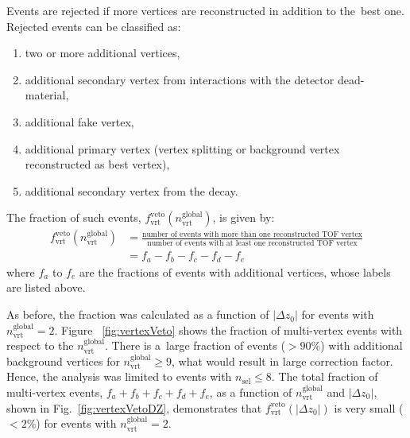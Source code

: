 Events are rejected if more vertices are reconstructed in addition to the~best one. Rejected events can be classified as:

\begin{enumerate}[label=\alph*)]
	\item two or more additional vertices,
	\item additional  secondary vertex from interactions with the detector dead-material,
	\item additional fake  vertex,
	\item additional primary  vertex (vertex splitting or background vertex reconstructed as best vertex),
	\item additional secondary vertex from the decay.  
\end{enumerate}
The fraction of such events, $f_\textrm{vrt}^\textrm{veto}\left(n_\textrm{vrt}^\textrm{global}\right)$, is given by: 
\begin{equation}
\begin{split}
f_\textrm{vrt}^\textrm{veto}\left(n_\textrm{vrt}^\textrm{global}\right) & =\frac{\textrm{number of events with more than one reconstructed  TOF vertex}}{\textrm{number of events with at least one reconstructed TOF vertex}} \\
& =f_a-f_b-f_c-f_d-f_e
\end{split}
\label{eq:vertexVetoEq}
\end{equation}
where $f_a$ to $f_e$ are the fractions of events with additional vertices, whose labels  are listed above.%

As before, the fraction was calculated as a function of $|\Delta z_0|$ for events with $n^\textrm{global}_\textrm{vrt}=2$. Figure~ \ref{fig:vertexVeto} shows the fraction of multi-vertex events  with respect to the $n_\textrm{vrt}^\textrm{global}$. There is a~large fraction of events ($>90\%$) with additional background vertices for $n_\textrm{vrt}^\textrm{global}\geq 9$, what would result in large correction factor. Hence, the analysis was limited to events with $n_\textrm{sel}\leq8$. The total fraction of multi-vertex events, $f_a+f_b+f_c+f_d+f_e$, as a function of $n^\textrm{global}_\textrm{vrt}$ and $|\Delta z_0|$, shown in Fig.~\ref{fig:vertexVetoDZ}, demonstrates that $f_\textrm{vrt}^\textrm{veto}(|\Delta z_0|)$ is very small ($<2\%$) for events with $n^\textrm{global}_\textrm{vrt}=2$.

